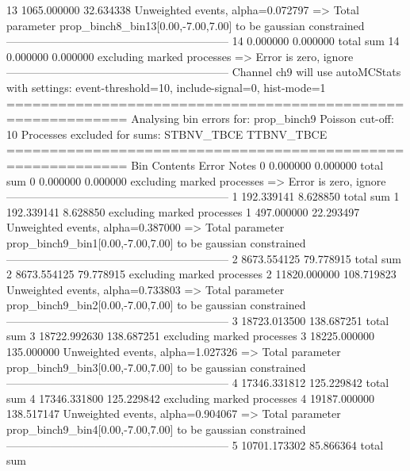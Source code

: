 13         1065.000000     32.634338       Unweighted events, alpha=0.072797
  => Total parameter prop_binch8_bin13[0.00,-7.00,7.00] to be gaussian constrained
------------------------------------------------------------
14         0.000000        0.000000        total sum                     
14         0.000000        0.000000        excluding marked processes    
  => Error is zero, ignore      
------------------------------------------------------------
Channel ch9 will use autoMCStats with settings: event-threshold=10, include-signal=0, hist-mode=1
============================================================
Analysing bin errors for: prop_binch9
Poisson cut-off: 10
Processes excluded for sums: STBNV_TBCE TTBNV_TBCE
============================================================
Bin        Contents        Error           Notes                         
0          0.000000        0.000000        total sum                     
0          0.000000        0.000000        excluding marked processes    
  => Error is zero, ignore      
------------------------------------------------------------
1          192.339141      8.628850        total sum                     
1          192.339141      8.628850        excluding marked processes    
1          497.000000      22.293497       Unweighted events, alpha=0.387000
  => Total parameter prop_binch9_bin1[0.00,-7.00,7.00] to be gaussian constrained
------------------------------------------------------------
2          8673.554125     79.778915       total sum                     
2          8673.554125     79.778915       excluding marked processes    
2          11820.000000    108.719823      Unweighted events, alpha=0.733803
  => Total parameter prop_binch9_bin2[0.00,-7.00,7.00] to be gaussian constrained
------------------------------------------------------------
3          18723.013500    138.687251      total sum                     
3          18722.992630    138.687251      excluding marked processes    
3          18225.000000    135.000000      Unweighted events, alpha=1.027326
  => Total parameter prop_binch9_bin3[0.00,-7.00,7.00] to be gaussian constrained
------------------------------------------------------------
4          17346.331812    125.229842      total sum                     
4          17346.331800    125.229842      excluding marked processes    
4          19187.000000    138.517147      Unweighted events, alpha=0.904067
  => Total parameter prop_binch9_bin4[0.00,-7.00,7.00] to be gaussian constrained
------------------------------------------------------------
5          10701.173302    85.866364       total sum                     
